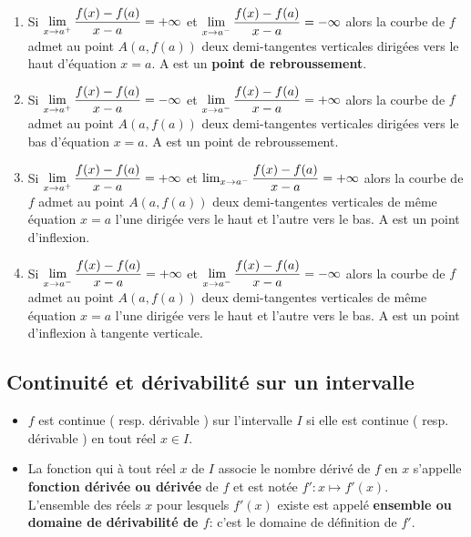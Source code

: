 \begin{enumerate}
\item Si $\displaystyle \lim_{x \to a^{+}} \dfrac{f(x)-f(a)}{x-a}=+\infty $   et $ \displaystyle\lim_{x \to a^{-}} \dfrac{f(x)-f(a)}{x-a}=-\infty $ alors la courbe de $ f $ admet  au  point $ A (a, f (a)) $ deux demi-tangentes verticales  dirigées vers le haut  d'équation $ x=a $.  A est un \textbf{point de rebroussement}.
\item Si $\displaystyle \lim_{x \to a^{+}} \dfrac{f(x)-f(a)}{x-a}=-\infty $   et $\displaystyle \lim_{x \to a^{-}} \dfrac{f(x)-f(a)}{x-a}=+\infty $ alors la courbe de $ f $ admet  au  point $ A (a, f (a)) $ deux demi-tangentes verticales  dirigées vers le bas  d'équation $ x=a $.  A est un point de rebroussement.
\item Si $ \displaystyle\lim_{x \to a^{+}} \dfrac{f(x)-f(a)}{x-a}=+\infty $   et $ \lim_{x \to a^{-}} \dfrac{f(x)-f(a)}{x-a}=+\infty $ alors la courbe de $ f $ admet  au  point $ A (a, f (a)) $ deux demi-tangentes verticales de même équation $ x=a $ l'une dirigée vers le haut et l'autre vers le bas.  A est un point d'inflexion.
\item Si $ \displaystyle \lim_{x \to a^{-}} \dfrac{f(x)-f(a)}{x-a}=+\infty $   et $ \displaystyle \lim_{x \to a^{-}} \dfrac{f(x)-f(a)}{x-a}=-\infty $ alors la courbe de $ f $ admet  au  point $ A (a, f (a)) $ deux demi-tangentes verticales de même équation $ x=a $ l'une dirigée vers le haut et l'autre vers le bas.  A est un point d'inflexion à tangente verticale.
\end{enumerate}
\subsection{Continuité et dérivabilité sur un intervalle}
\begin{definition}
\begin{itemize}
\item  $ f $ est continue  ( resp. dérivable ) sur l'intervalle  $ I $ si elle est continue ( resp. dérivable ) en tout réel  $x \in I. $
\item 	La fonction qui à tout réel $ x $  de $ I $ associe le nombre dérivé de $ f $ en $ x $ s'appelle \textbf{ fonction dérivée  ou dérivée} de $ f $ et est notée $ f': x\mapsto f'(x) $. \\
  L'ensemble des réels $ x $ pour lesquels $f'(x) $ existe est appelé \textbf{ ensemble ou domaine de dérivabilité de $f$}: c'est le domaine de définition de $ f'. $
  \end{itemize}
\end{definition}

